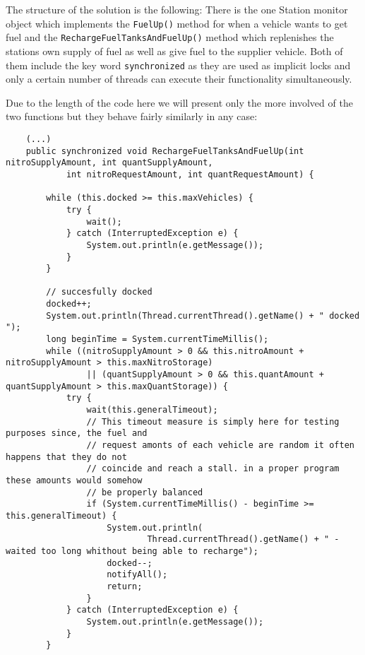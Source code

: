 \documentclass[a4paper,11pt]{article}
\begin{document}
The structure of the solution is the following: There is the one Station monitor object which implements the {\tt FuelUp()} method for when a vehicle wants to get fuel and the {\tt RechargeFuelTanksAndFuelUp()} method which replenishes the stations own supply of fuel as well as give fuel to the supplier vehicle. Both of them include the key word {\tt synchronized} as they are used as implicit locks and only a certain number of threads can execute their functionality simultaneously.

Due to the length of the code here we will present only the more involved of the two functions but they behave fairly similarly in any case:

\begin{verbatim}
    (...)
    public synchronized void RechargeFuelTanksAndFuelUp(int nitroSupplyAmount, int quantSupplyAmount,
            int nitroRequestAmount, int quantRequestAmount) {

        while (this.docked >= this.maxVehicles) {
            try {
                wait();
            } catch (InterruptedException e) {
                System.out.println(e.getMessage());
            }
        }

        // succesfully docked
        docked++;
        System.out.println(Thread.currentThread().getName() + " docked ");
        long beginTime = System.currentTimeMillis();
        while ((nitroSupplyAmount > 0 && this.nitroAmount + nitroSupplyAmount > this.maxNitroStorage)
                || (quantSupplyAmount > 0 && this.quantAmount + quantSupplyAmount > this.maxQuantStorage)) {
            try {
                wait(this.generalTimeout);
                // This timeout measure is simply here for testing purposes since, the fuel and
                // request amonts of each vehicle are random it often happens that they do not
                // coincide and reach a stall. in a proper program these amounts would somehow
                // be properly balanced
                if (System.currentTimeMillis() - beginTime >= this.generalTimeout) {
                    System.out.println(
                            Thread.currentThread().getName() + " - waited too long whithout being able to recharge");
                    docked--;
                    notifyAll();
                    return;
                }
            } catch (InterruptedException e) {
                System.out.println(e.getMessage());
            }
        }


\end{verbatim}
\end{document}
